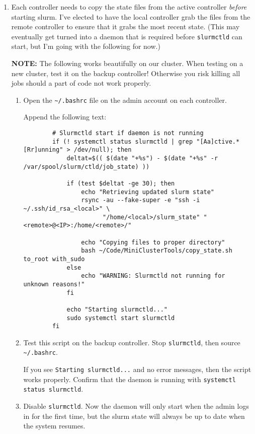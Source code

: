 \begin{enumerate}
\item Each controller needs to copy the state files from the active controller \emph{before} starting slurm. I've elected to have the local controller grab the files from the remote controller to ensure that it grabs the most recent state. (This may eventually get turned into a daemon that is required before \texttt{slurmctld} can start, but I'm going with the following for now.) 

	\textbf{NOTE:} The following works beautifully on our cluster. When testing on a new cluster, test it on the backup controller! Otherwise you risk killing all jobs should a part of code not work properly.

	\begin{enumerate}
	\item Open the \texttt{\textasciitilde /.bashrc} file on the admin account on each controller.

		Append the following text:
		\begin{verbatim}
		# Slurmctld start if daemon is not running
		if (! systemctl status slurmctld | grep "[Aa]ctive.*[Rr]unning" > /dev/null); then
		    deltat=$(( $(date "+%s") - $(date "+%s" -r /var/spool/slurm/ctld/job_state) ))

		    if (test $deltat -ge 30); then
		        echo "Retrieving updated slurm state"
		        rsync -au --fake-super -e "ssh -i ~/.ssh/id_rsa_<local>" \
		              "/home/<local>/slurm_state" "<remote>@<IP>:/home/<remote>/"

		        echo "Copying files to proper directory"
		        bash ~/Code/MiniClusterTools/copy_state.sh to_root with_sudo
		    else
		        echo "WARNING: Slurmctld not running for unknown reasons!"
		    fi

		    echo "Starting slurmctld..."
		    sudo systemctl start slurmctld
		fi
		\end{verbatim}

	\item Test this script on the backup controller. Stop \texttt{slurmctld}, then source \texttt{\textasciitilde /.bashrc}.	

		If you see \texttt{Starting slurmctld...} and no error messages, then the script works properly. Confirm that the daemon is running with \texttt{systemctl status slurmctld}.

	\item Disable \texttt{slurmctld}. Now the daemon will only start when the admin logs in for the first time, but the slurm state will always be up to date when the system resumes.
	\end{enumerate}


\end{enumerate}
